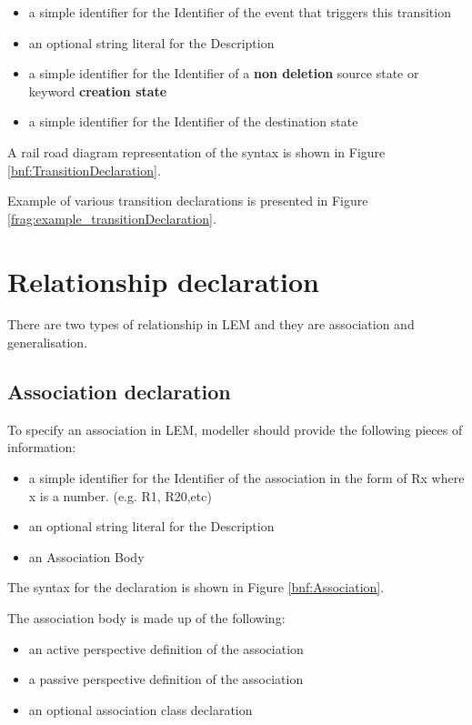 \begin{itemize}
\item a simple identifier for the Identifier of the event that triggers this transition
\item an optional string literal for the Description
\item a simple identifier for the Identifier of a \textbf{non deletion} source state or keyword \textbf{creation state}
\item a simple identifier for the Identifier of the destination state
\end{itemize}

A rail road diagram representation of the syntax is shown in Figure \ref{bnf:TransitionDeclaration}.


Example of various transition declarations is presented in Figure \ref{frag:example_transitionDeclaration}.


\section{Relationship declaration}\label{sec:RelationshipDeclaration}
There are two types of relationship in LEM and they are association and generalisation.
\subsection{Association declaration}
To specify an association in LEM, modeller should provide the following pieces of information:

\begin{itemize}
\item a simple identifier for the Identifier of the association in the form of Rx where x is a number. (e.g. R1, R20,etc)
\item an optional string literal for the Description
\item an Association Body
\end{itemize}

The syntax for the declaration is shown in Figure \ref{bnf:Association}.

The association body is made up of the following:
\begin{itemize}
\item an active perspective definition of the association
\item a passive perspective definition of the association
\item an optional association class declaration
\end{itemize}

